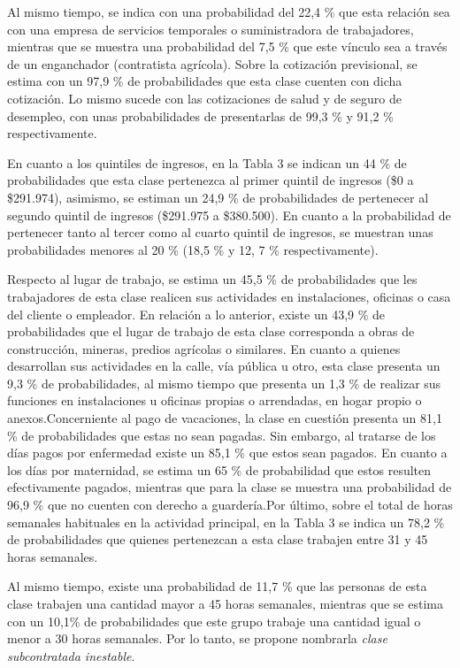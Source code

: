 \documentclass[
]{article}
\begin{document}
Al mismo tiempo, se indica con una probabilidad del 22,4 \% que esta
relación sea con una empresa de servicios temporales o suministradora de
trabajadores, mientras que se muestra una probabilidad del 7,5 \% que
este vínculo sea a través de un enganchador (contratista agrícola).
Sobre la cotización previsional, se estima con un 97,9 \% de
probabilidades que esta clase cuenten con dicha cotización. Lo mismo
sucede con las cotizaciones de salud y de seguro de desempleo, con unas
probabilidades de presentarlas de 99,3 \% y 91,2 \% respectivamente.

En cuanto a los quintiles de ingresos, en la Tabla 3 se indican un 44 \%
de probabilidades que esta clase pertenezca al primer quintil de
ingresos (\$0 a \$291.974), asimismo, se estiman un 24,9 \% de
probabilidades de pertenecer al segundo quintil de ingresos (\$291.975 a
\$380.500). En cuanto a la probabilidad de pertenecer tanto al tercer
como al cuarto quintil de ingresos, se muestran unas probabilidades
menores al 20 \% (18,5 \% y 12, 7 \% respectivamente).

Respecto al lugar de trabajo, se estima un 45,5 \% de probabilidades que
les trabajadores de esta clase realicen sus actividades en
instalaciones, oficinas o casa del cliente o empleador. En relación a lo
anterior, existe un 43,9 \% de probabilidades que el lugar de trabajo de
esta clase corresponda a obras de construcción, mineras, predios
agrícolas o similares. En cuanto a quienes desarrollan sus actividades
en la calle, vía pública u otro, esta clase presenta un 9,3 \% de
probabilidades, al mismo tiempo que presenta un 1,3 \% de realizar sus
funciones en instalaciones u oficinas propias o arrendadas, en hogar
propio o anexos.Concerniente al pago de vacaciones, la clase en cuestión
presenta un 81,1 \% de probabilidades que estas no sean pagadas. Sin
embargo, al tratarse de los días pagos por enfermedad existe un 85,1 \%
que estos sean pagados. En cuanto a los días por maternidad, se estima
un 65 \% de probabilidad que estos resulten efectivamente pagados,
mientras que para la clase se muestra una probabilidad de 96,9 \% que no
cuenten con derecho a guardería.Por último, sobre el total de horas
semanales habituales en la actividad principal, en la Tabla 3 se indica
un 78,2 \% de probabilidades que quienes pertenezcan a esta clase
trabajen entre 31 y 45 horas semanales.

Al mismo tiempo, existe una probabilidad de 11,7 \% que las personas de
esta clase trabajen una cantidad mayor a 45 horas semanales, mientras
que se estima con un 10,1\% de probabilidades que este grupo trabaje una
cantidad igual o menor a 30 horas semanales. Por lo tanto, se propone
nombrarla \emph{clase subcontratada inestable}.
\end{document}
